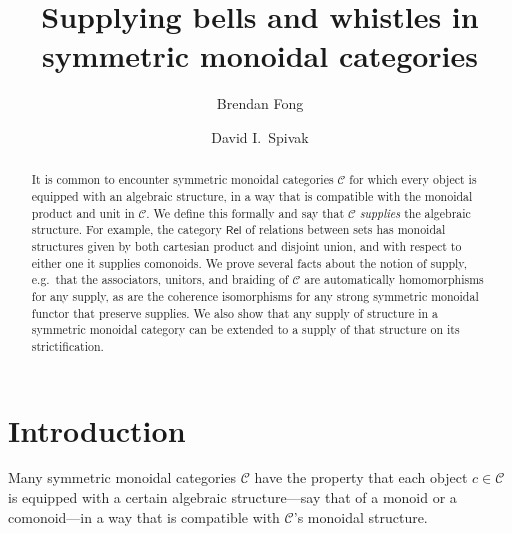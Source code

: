 \documentclass[11pt, oneside, article]{memoir}
\theoremstyle{plain}
\theoremstyle{definition}
\theoremstyle{remark}
\newcommand{\cat}[1]{\mathcal{#1}}%
\newcommand{\Cat}[1]{{\mathsf{#1}}}%
\newcommand{\rel}{\Cat{Rel}}
\begin{document}
   

\title{Supplying bells and whistles in\\symmetric monoidal categories}
\author{Brendan Fong \and David I.\ Spivak}
\date{\vspace{-.3in}}
  
\maketitle

\begin{abstract}
It is common to encounter symmetric monoidal categories $\cat{C}$ for which every object is equipped with an algebraic structure, in a way that is compatible with the monoidal product and unit in $\cat{C}$. We define this formally and say that $\cat{C}$ \emph{supplies} the algebraic structure. For example, the category $\rel$ of relations between sets has monoidal structures given by both cartesian product and disjoint union, and with respect to either one it supplies comonoids. We prove several facts about the notion of supply, e.g.\ that the associators, unitors, and braiding of $\cat{C}$ are automatically homomorphisms for any supply, as are the coherence isomorphisms for any strong symmetric monoidal functor that preserve supplies. We also show that any supply of structure in a symmetric monoidal category can be extended to a supply of that structure on its strictification.

\end{abstract}

\chapter{Introduction}

Many symmetric monoidal categories $\cat{C}$ have the property that each object $c\in\cat{C}$ is equipped with a certain algebraic structure---say that of a monoid or a comonoid---in a way that is compatible with $\cat{C}$'s monoidal structure.
\end{document}
